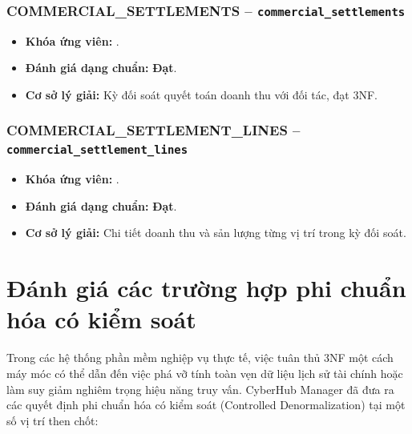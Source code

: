 \subsubsection{COMMERCIAL_SETTLEMENTS -- \texttt{commercial\_settlements}}
\begin{itemize}
  \item \textbf{Khóa ứng viên:} \texttt{}.
  \item \textbf{Đánh giá dạng chuẩn:} \textbf{Đạt}.
  \item \textbf{Cơ sở lý giải:} Kỳ đối soát quyết toán doanh thu với đối tác, đạt 3NF.
\end{itemize}

\subsubsection{COMMERCIAL_SETTLEMENT_LINES -- \texttt{commercial\_settlement\_lines}}
\begin{itemize}
  \item \textbf{Khóa ứng viên:} \texttt{}.
  \item \textbf{Đánh giá dạng chuẩn:} \textbf{Đạt}.
  \item \textbf{Cơ sở lý giải:} Chi tiết doanh thu và sản lượng từng vị trí trong kỳ đối soát.
\end{itemize}

\section{Đánh giá các trường hợp phi chuẩn hóa có kiểm soát}
Trong các hệ thống phần mềm nghiệp vụ thực tế, việc tuân thủ 3NF một cách máy móc có thể dẫn đến việc phá vỡ tính toàn vẹn dữ liệu lịch sử tài chính hoặc làm suy giảm nghiêm trọng hiệu năng truy vấn. CyberHub Manager đã đưa ra các quyết định phi chuẩn hóa có kiểm soát (Controlled Denormalization) tại một số vị trí then chốt:\par

